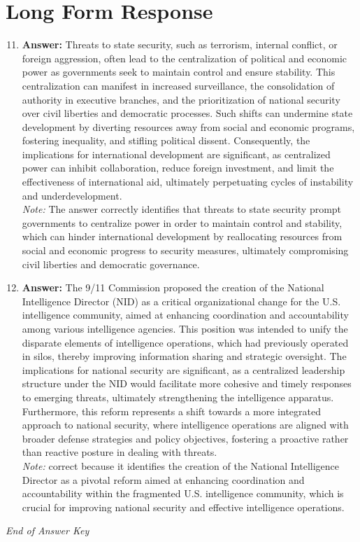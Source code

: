 \documentclass[12pt]{article}
\begin{document}
\section*{Long Form Response}
\begin{enumerate}[label=\arabic*.]
\setcounter{enumi}{10}
\item \textbf{Answer:} Threats to state security, such as terrorism, internal conflict, or foreign aggression, often lead to the centralization of political and economic power as governments seek to maintain control and ensure stability. This centralization can manifest in increased surveillance, the consolidation of authority in executive branches, and the prioritization of national security over civil liberties and democratic processes. Such shifts can undermine state development by diverting resources away from social and economic programs, fostering inequality, and stifling political dissent. Consequently, the implications for international development are significant, as centralized power can inhibit collaboration, reduce foreign investment, and limit the effectiveness of international aid, ultimately perpetuating cycles of instability and underdevelopment.
\\ \textit{Note:} The answer correctly identifies that threats to state security prompt governments to centralize power in order to maintain control and stability, which can hinder international development by reallocating resources from social and economic progress to security measures, ultimately compromising civil liberties and democratic governance.
\item \textbf{Answer:} The 9/11 Commission proposed the creation of the National Intelligence Director (NID) as a critical organizational change for the U.S. intelligence community, aimed at enhancing coordination and accountability among various intelligence agencies. This position was intended to unify the disparate elements of intelligence operations, which had previously operated in silos, thereby improving information sharing and strategic oversight. The implications for national security are significant, as a centralized leadership structure under the NID would facilitate more cohesive and timely responses to emerging threats, ultimately strengthening the intelligence apparatus. Furthermore, this reform represents a shift towards a more integrated approach to national security, where intelligence operations are aligned with broader defense strategies and policy objectives, fostering a proactive rather than reactive posture in dealing with threats.
\\ \textit{Note:} correct because it identifies the creation of the National Intelligence Director as a pivotal reform aimed at enhancing coordination and accountability within the fragmented U.S. intelligence community, which is crucial for improving national security and effective intelligence operations.
\end{enumerate}

\vfill
\noindent\textit{End of Answer Key}
\end{document}
